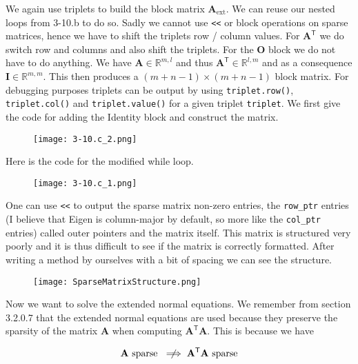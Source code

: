 \documentclass{article}
\begin{document}
We again use triplets to build the block matrix $\mathbf{A}_{\text{ext}}$. We can reuse our nested loops from 3-10.b to do so. Sadly we cannot use \verb|<<| or block operations on sparse matrices, hence we have to shift the triplets row / column values. For $\mathbf{A}^{\mathsf{T}}$ we do switch row and columns and also shift the triplets. For the $\mathbf{O}$ block we do not have to do anything. We have $\mathbf{A} \in \mathbb{R}^{m,l}$ and thus $\mathbf{A}^{\mathsf{T}} \in \mathbb{R}^{l,m}$ and as a consequence $\mathbf{I} \in \mathbb{R}^{m,m}$. This then produces a $\left(m + n - 1\right) \times \left(m+n-1\right)$ block matrix. For debugging purposes triplets can be output by using \verb|triplet.row()|, \verb|triplet.col()| and \verb|triplet.value()| for a given triplet \verb|triplet|. We first give the code for adding the Identity block and construct the matrix. 

\begin{figure}[!hbt]
    \centering
\texttt{[image: 3-10.c\_2.png]}
\end{figure}

\pagebreak

\noindent Here is the code for the modified while loop.

\begin{figure}[!hbt]
    \centering
\texttt{[image: 3-10.c\_1.png]}
\end{figure}


\noindent One can use \verb|<<| to output the sparse matrix non-zero entries, the \verb|row_ptr| entries (I believe that Eigen is column-major by default, so more like the \verb|col_ptr| entries) called outer pointers and the matrix itself. This matrix is structured very poorly and it is thus difficult to see if the matrix is correctly formatted. After writing a method by ourselves with a bit of spacing we can see the structure.

\begin{figure}[!hbt]
    \centering
\texttt{[image: SparseMatrixStructure.png]}
\end{figure}

\noindent Now we want to solve the extended normal equations. We remember from section 3.2.0.7 that the extended normal equations are used because they preserve the sparsity of the matrix $\mathbf{A}$ when computing $\mathbf{A}^{\mathsf{T}}\mathbf{A}$. This is because we have 

\begin{equation*}
    \mathbf{A} \text{ sparse } \centernot\implies \mathbf{A}^{\mathsf{T}}\mathbf{A} \text{ sparse}
\end{equation*}
\end{document}
